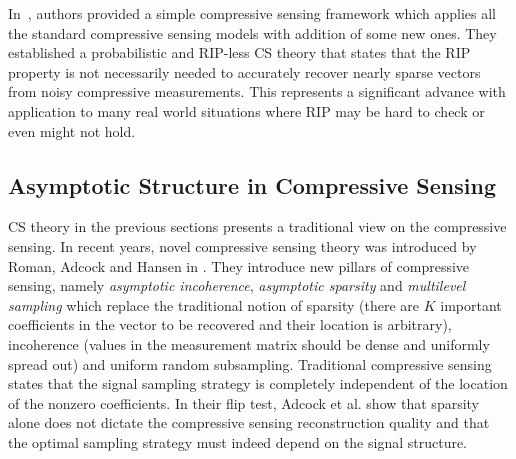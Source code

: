 \documentclass[journal]{IEEEtran}
\begin{document}
In~\cite{Candes2011}, authors provided a simple compressive sensing framework which applies all the standard compressive sensing models with addition of some new ones. They established a probabilistic and RIP-less CS theory that states that the RIP property is not necessarily needed to accurately recover nearly sparse vectors from noisy compressive measurements. This represents a significant advance with application to many real world situations where RIP may be hard to check or even might not hold.

\subsection{Asymptotic Structure in Compressive Sensing}
CS theory in the previous sections presents a traditional view on the compressive sensing. In recent years, novel compressive sensing theory was introduced by Roman, Adcock and Hansen in \cite{Adcock2013, Adcock2015, Roman2014, Adcock}. They introduce new pillars of compressive sensing, namely \textit{asymptotic incoherence}, \textit{asymptotic sparsity} and \textit{multilevel sampling} which replace the traditional notion of sparsity (there are $K$ important coefficients in the vector to be recovered and their location is arbitrary), incoherence (values in the measurement matrix should be dense and uniformly spread out) and uniform random subsampling. Traditional compressive sensing states that the signal sampling strategy is completely independent of the location of the nonzero coefficients. In their flip test, Adcock et al. show that sparsity alone does not dictate the compressive sensing reconstruction quality and that the optimal sampling strategy must indeed depend on the signal structure.
\end{document}
